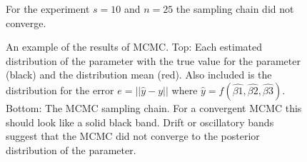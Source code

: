 \documentclass[10pt,a4paper]{article}
\begin{document}
\begin{figure}
\centering
\noindent{}
\caption{For the experiment $s=10$ and $n=25$ the sampling chain did not converge.}
\label{fig:mcmcnoconverge}
\end{figure}


\begin{figure}
\centering
\noindent{}
\caption{An example of the results of MCMC. Top: Each estimated distribution of the parameter with the true value for the parameter (black) and the distribution mean (red). Also included is the distribution for the error $e=||\hat{y}-y||$ where $\hat{y}=f(\hat{\beta1},\hat{\beta2},\hat{\beta3})$. Bottom: The MCMC sampling chain. For a convergent MCMC this should look like a solid black band. Drift or oscillatory bands suggest that the MCMC did not converge to the posterior distribution of the parameter.}
\label{fig:mcmcoutput}
\end{figure}
\end{document}
